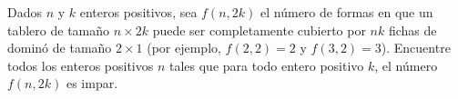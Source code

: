 Dados $n$ y $k$ enteros positivos, sea $f(n,2k)$ el número de formas en que un tablero de tamaño $n \times 2k$ puede ser completamente cubierto por $nk$ fichas de dominó de tamaño $2 \times 1$ (por ejemplo, $f(2,2) = 2$ y $f(3,2) = 3$).
Encuentre todos los enteros positivos $n$ tales que para todo entero positivo $k$, el número $f(n,2k)$ es impar.